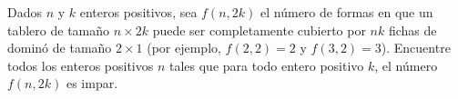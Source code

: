 Dados $n$ y $k$ enteros positivos, sea $f(n,2k)$ el número de formas en que un tablero de tamaño $n \times 2k$ puede ser completamente cubierto por $nk$ fichas de dominó de tamaño $2 \times 1$ (por ejemplo, $f(2,2) = 2$ y $f(3,2) = 3$).
Encuentre todos los enteros positivos $n$ tales que para todo entero positivo $k$, el número $f(n,2k)$ es impar.